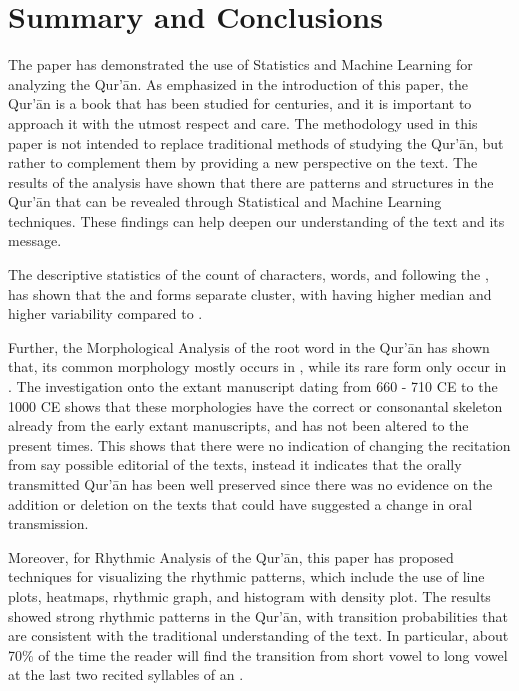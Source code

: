\chapter{Summary and Conclusions}\label{ch:conclusion}
The paper has demonstrated the use of Statistics and Machine Learning for analyzing the Qur'\=an. As emphasized in the introduction of this paper, the Qur'\=an is a book that has been studied for centuries, and it is important to approach it with the utmost respect and care. The methodology used in this paper is not intended to replace traditional methods of studying the Qur'\=an, but rather to complement them by providing a new perspective on the text. The results of the analysis have shown that there are patterns and structures in the Qur'\=an that can be revealed through Statistical and Machine Learning techniques. These findings can help deepen our understanding of the text and its message.

The descriptive statistics of the count of characters, words, and   following the  , has shown that the   and  \newline{}  forms separate cluster, with   having higher median and higher variability compared to  . 

Further, the Morphological Analysis of the root word   in the Qur'\=an has shown that, its common morphology   mostly occurs in  , while its rare form only occur in  . The investigation onto the extant manuscript dating from 660 - 710 CE to the 1000 CE shows that these morphologies have the correct   or consonantal skeleton already from the early extant manuscripts, and has not been altered to the present times. This shows that there were no indication of changing the recitation from say possible editorial of the texts, instead it indicates that the orally transmitted Qur'\=an has been well preserved since there was no evidence on the addition or deletion on the texts that could have suggested a change in oral transmission.

Moreover, for Rhythmic Analysis of the Qur'\=an, this paper has proposed techniques for visualizing the rhythmic patterns, which include the use of line plots, heatmaps, rhythmic graph, and histogram with density plot. The results showed strong rhythmic patterns in the Qur'\=an, with transition probabilities that are consistent with the traditional understanding of the text. In particular, about 70\% of the time the reader will find the transition from short vowel to long vowel at the last two recited syllables of an  .

